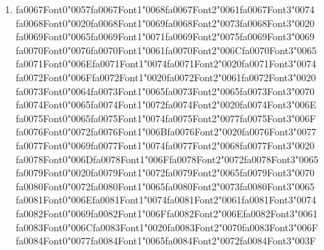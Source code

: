 \documentclass[12pt]{article}
\begin{document}
\begin{enumerate}[label=Q\arabic*.]
\item {\csname fa0067Font0\endcsname\char"0057}{\csname fa0067Font1\endcsname\char"0068}{\csname fa0067Font2\endcsname\char"0061}{\csname fa0067Font3\endcsname\char"0074} {\csname fa0068Font0\endcsname\char"0020}{\csname fa0068Font1\endcsname\char"0069}{\csname fa0068Font2\endcsname\char"0073}{\csname fa0068Font3\endcsname\char"0020} {\csname fa0069Font0\endcsname\char"0065}{\csname fa0069Font1\endcsname\char"0071}{\csname fa0069Font2\endcsname\char"0075}{\csname fa0069Font3\endcsname\char"0069} {\csname fa0070Font0\endcsname\char"0076}{\csname fa0070Font1\endcsname\char"0061}{\csname fa0070Font2\endcsname\char"006C}{\csname fa0070Font3\endcsname\char"0065} {\csname fa0071Font0\endcsname\char"006E}{\csname fa0071Font1\endcsname\char"0074}{\csname fa0071Font2\endcsname\char"0020}{\csname fa0071Font3\endcsname\char"0074} {\csname fa0072Font0\endcsname\char"006F}{\csname fa0072Font1\endcsname\char"0020}{\csname fa0072Font2\endcsname\char"0061}{\csname fa0072Font3\endcsname\char"0020} {\csname fa0073Font0\endcsname\char"0064}{\csname fa0073Font1\endcsname\char"0065}{\csname fa0073Font2\endcsname\char"0065}{\csname fa0073Font3\endcsname\char"0070} {\csname fa0074Font0\endcsname\char"0065}{\csname fa0074Font1\endcsname\char"0072}{\csname fa0074Font2\endcsname\char"0020}{\csname fa0074Font3\endcsname\char"006E} {\csname fa0075Font0\endcsname\char"0065}{\csname fa0075Font1\endcsname\char"0074}{\csname fa0075Font2\endcsname\char"0077}{\csname fa0075Font3\endcsname\char"006F} {\csname fa0076Font0\endcsname\char"0072}{\csname fa0076Font1\endcsname\char"006B}{\csname fa0076Font2\endcsname\char"0020}{\csname fa0076Font3\endcsname\char"0077} {\csname fa0077Font0\endcsname\char"0069}{\csname fa0077Font1\endcsname\char"0074}{\csname fa0077Font2\endcsname\char"0068}{\csname fa0077Font3\endcsname\char"0020} {\csname fa0078Font0\endcsname\char"006D}{\csname fa0078Font1\endcsname\char"006F}{\csname fa0078Font2\endcsname\char"0072}{\csname fa0078Font3\endcsname\char"0065} {\csname fa0079Font0\endcsname\char"0020}{\csname fa0079Font1\endcsname\char"0072}{\csname fa0079Font2\endcsname\char"0065}{\csname fa0079Font3\endcsname\char"0070} {\csname fa0080Font0\endcsname\char"0072}{\csname fa0080Font1\endcsname\char"0065}{\csname fa0080Font2\endcsname\char"0073}{\csname fa0080Font3\endcsname\char"0065} {\csname fa0081Font0\endcsname\char"006E}{\csname fa0081Font1\endcsname\char"0074}{\csname fa0081Font2\endcsname\char"0061}{\csname fa0081Font3\endcsname\char"0074} {\csname fa0082Font0\endcsname\char"0069}{\csname fa0082Font1\endcsname\char"006F}{\csname fa0082Font2\endcsname\char"006E}{\csname fa0082Font3\endcsname\char"0061} {\csname fa0083Font0\endcsname\char"006C}{\csname fa0083Font1\endcsname\char"0020}{\csname fa0083Font2\endcsname\char"0070}{\csname fa0083Font3\endcsname\char"006F} {\csname fa0084Font0\endcsname\char"0077}{\csname fa0084Font1\endcsname\char"0065}{\csname fa0084Font2\endcsname\char"0072}{\csname fa0084Font3\endcsname\char"003F}

\end{enumerate}
\end{document}

